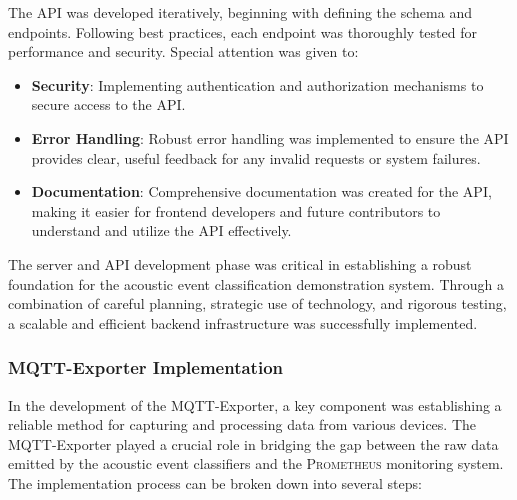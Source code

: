 The API was developed iteratively, beginning with defining the schema and endpoints. Following best practices, each endpoint was thoroughly tested for performance and security. Special attention was given to:

\begin{itemize}
  \item \textbf{Security}: Implementing authentication and authorization mechanisms to secure access to the API.
  \item \textbf{Error Handling}: Robust error handling was implemented to ensure the API provides clear, useful feedback for any invalid requests or system failures.
  \item \textbf{Documentation}: Comprehensive documentation was created for the API, making it easier for frontend developers and future contributors to understand and utilize the API effectively.
\end{itemize}

The server and API development phase was critical in establishing a robust foundation for the acoustic event classification demonstration system. Through a combination of careful planning, strategic use of technology, and rigorous testing, a scalable and efficient backend infrastructure was successfully implemented.

\subsubsection{MQTT-Exporter Implementation}

In the development of the MQTT-Exporter, a key component was establishing a reliable method for capturing and processing data from various devices. The MQTT-Exporter played a crucial role in bridging the gap between the raw data emitted by the acoustic event classifiers and the \textsc{Prometheus} monitoring system. The implementation process can be broken down into several steps:

